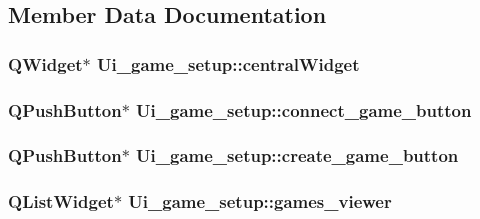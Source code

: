 \subsection{Member Data Documentation}
\hypertarget{classUi__game__setup_a4dfcb4d3bf0a2f29f9bc8354c9687dfd}{
\subsubsection[{central\-Widget}]{\setlength{\rightskip}{0pt plus 5cm}Q\-Widget$\ast$ Ui\-\_\-game\-\_\-setup\-::central\-Widget}}\label{classUi__game__setup_a4dfcb4d3bf0a2f29f9bc8354c9687dfd}
\hypertarget{classUi__game__setup_a91b386cf441741790b6e05490fda2559}{
\subsubsection[{connect\-\_\-game\-\_\-button}]{\setlength{\rightskip}{0pt plus 5cm}Q\-Push\-Button$\ast$ Ui\-\_\-game\-\_\-setup\-::connect\-\_\-game\-\_\-button}}\label{classUi__game__setup_a91b386cf441741790b6e05490fda2559}
\hypertarget{classUi__game__setup_a272a6d3379864cedacdcb5f39cce438b}{
\subsubsection[{create\-\_\-game\-\_\-button}]{\setlength{\rightskip}{0pt plus 5cm}Q\-Push\-Button$\ast$ Ui\-\_\-game\-\_\-setup\-::create\-\_\-game\-\_\-button}}\label{classUi__game__setup_a272a6d3379864cedacdcb5f39cce438b}
\hypertarget{classUi__game__setup_a5f16472eaa18f7bd1aa1ce30d5362a1c}{
\subsubsection[{games\-\_\-viewer}]{\setlength{\rightskip}{0pt plus 5cm}Q\-List\-Widget$\ast$ Ui\-\_\-game\-\_\-setup\-::games\-\_\-viewer}}\label{classUi__game__setup_a5f16472eaa18f7bd1aa1ce30d5362a1c}
